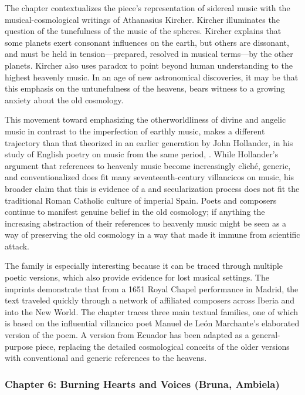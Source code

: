 \documentclass[tt]{vcbook-proposal}
\begin{document}
The chapter contextualizes the piece's representation of sidereal music with the musical-cosmological writings of Athanasius Kircher.
Kircher illuminates the question of the tunefulness of the music of the spheres.
Kircher explains that some planets exert consonant influences on the earth, but others are dissonant, and must be held in tension---prepared, resolved in musical terms---by the other planets. 
Kircher also uses paradox to point beyond human understanding to the highest heavenly music. 
In an age of new astronomical discoveries, it may be that this emphasis on the untunefulness of the heavens, bears witness to a growing anxiety about the old cosmology.

This movement toward emphasizing the otherworldliness of divine and angelic music in contrast to the imperfection of earthly music, makes a different trajectory than that theorized in an earlier generation by John Hollander, in his study of English poetry on music from the same period, .
While Hollander's argument that references to heavenly music become increasingly cliché, generic, and conventionalized does fit many seventeenth-century villancicos on music, his broader claim that this is evidence of a  and secularization process does not fit the traditional Roman Catholic culture of imperial Spain.
Poets and composers continue to manifest genuine belief in the old cosmology; if anything the increasing abstraction of their references to heavenly music might be seen as a way of preserving the old cosmology in a way that made it immune from scientific attack.

The  family is especially interesting because it can be traced through multiple poetic versions, which also provide evidence for lost musical settings.
The imprints demonstrate that from a 1651 Royal Chapel performance in Madrid, the text traveled quickly through a network of affiliated composers across Iberia and into the New World. 
The chapter traces three main textual families, one of which is based on the influential villancico poet Manuel de León Marchante's elaborated version of the poem. 
A version from Ecuador has been adapted as a general-purpose piece, replacing the detailed cosmological conceits of the older versions with conventional and generic references to the heavens.


\subsubsection{Chapter 6: Burning Hearts and Voices (Bruna, Ambiela)}
\end{document}
